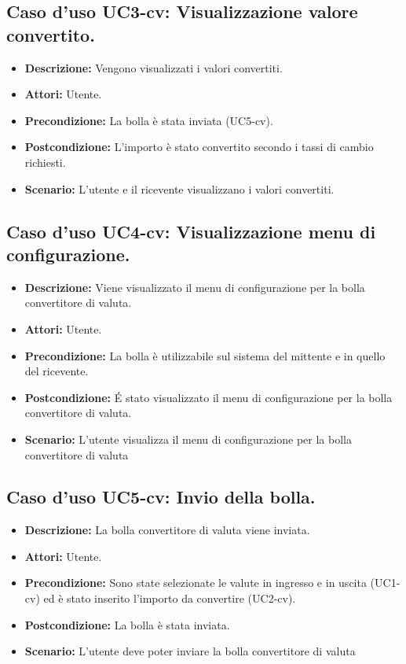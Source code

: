 \subsection{Caso d'uso UC3-cv: Visualizzazione valore convertito.}
\begin{itemize}
\item[]\textbf{Descrizione:} Vengono visualizzati i valori convertiti.
\item[]\textbf{Attori:} Utente. 
\item[]\textbf{Precondizione:} La bolla è stata inviata (UC5-cv). 
\item[]\textbf{Postcondizione:} L'importo è stato convertito secondo i tassi di cambio richiesti. 
\item[]\textbf{Scenario:}
L'utente e il ricevente visualizzano i valori convertiti. 
\end{itemize}

\subsection{Caso d'uso UC4-cv: Visualizzazione menu di configurazione.}
\begin{itemize}
\item[]\textbf{Descrizione:} Viene visualizzato il menu di configurazione per la bolla convertitore di valuta.
\item[]\textbf{Attori:} Utente. 
\item[]\textbf{Precondizione:} La bolla è utilizzabile sul sistema del mittente e in quello del ricevente. 
\item[]\textbf{Postcondizione:} \'E stato visualizzato il menu di configurazione per la bolla convertitore di valuta. 
\item[]\textbf{Scenario:}
L'utente visualizza il menu di configurazione per la bolla convertitore di valuta 
\end{itemize}

\subsection{Caso d'uso UC5-cv: Invio della bolla.}
\begin{itemize}
\item[]\textbf{Descrizione:} La bolla convertitore di valuta viene inviata.
\item[]\textbf{Attori:} Utente. 
\item[]\textbf{Precondizione:} Sono state selezionate le valute in ingresso e in uscita (UC1-cv) ed è stato inserito l'importo da convertire (UC2-cv). 
\item[]\textbf{Postcondizione:} La bolla è stata inviata. 
\item[]\textbf{Scenario:}
L'utente deve poter inviare la bolla convertitore di valuta 
\end{itemize}

